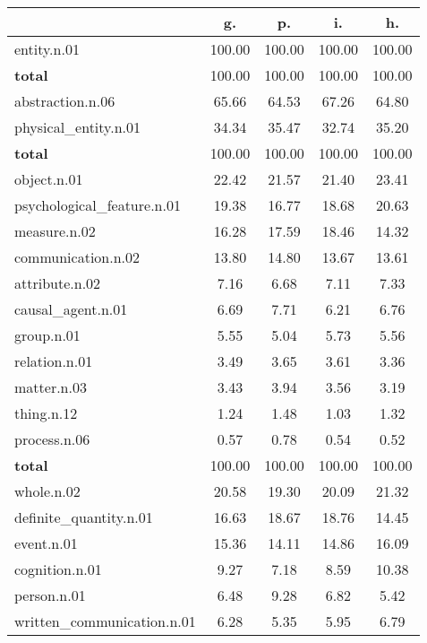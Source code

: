 \begin{table}[h!]
\begin{center}
\begin{tabular}{| l || c | c | c | c |}\hline
 & {\bf g.} & {\bf p.} & {\bf i.} & {\bf h.} \\\hline\hline
entity.n.01 & 100.00  & 100.00  & 100.00  & 100.00 \\\hline\hline
{{\bf total}} & 100.00  & 100.00  & 100.00  & 100.00 \\\hline\hline\hline
abstraction.n.06 & 65.66  & 64.53  & 67.26  & 64.80 \\\hline
physical\_entity.n.01 & 34.34  & 35.47  & 32.74  & 35.20 \\\hline\hline
{{\bf total}} & 100.00  & 100.00  & 100.00  & 100.00 \\\hline\hline\hline
object.n.01 & 22.42  & 21.57  & 21.40  & 23.41 \\\hline
psychological\_feature.n.01 & 19.38  & 16.77  & 18.68  & 20.63 \\\hline
measure.n.02 & 16.28  & 17.59  & 18.46  & 14.32 \\\hline
communication.n.02 & 13.80  & 14.80  & 13.67  & 13.61 \\\hline
attribute.n.02 & 7.16  & 6.68  & 7.11  & 7.33 \\\hline
causal\_agent.n.01 & 6.69  & 7.71  & 6.21  & 6.76 \\\hline
group.n.01 & 5.55  & 5.04  & 5.73  & 5.56 \\\hline
relation.n.01 & 3.49  & 3.65  & 3.61  & 3.36 \\\hline
matter.n.03 & 3.43  & 3.94  & 3.56  & 3.19 \\\hline
thing.n.12 & 1.24  & 1.48  & 1.03  & 1.32 \\\hline
process.n.06 & 0.57  & 0.78  & 0.54  & 0.52 \\\hline\hline
{{\bf total}} & 100.00  & 100.00  & 100.00  & 100.00 \\\hline\hline\hline
whole.n.02 & 20.58  & 19.30  & 20.09  & 21.32 \\\hline
definite\_quantity.n.01 & 16.63  & 18.67  & 18.76  & 14.45 \\\hline
event.n.01 & 15.36  & 14.11  & 14.86  & 16.09 \\\hline
cognition.n.01 & 9.27  & 7.18  & 8.59  & 10.38 \\\hline
person.n.01 & 6.48  & 9.28  & 6.82  & 5.42 \\\hline
written\_communication.n.01 & 6.28  & 5.35  & 5.95  & 6.79 \\\hline

\end{tabular}
\end{center}
\end{table}
